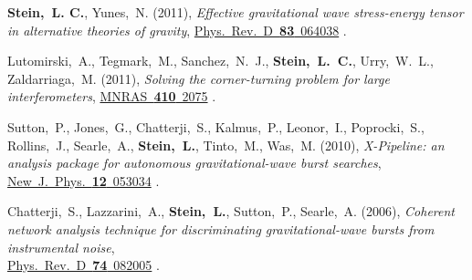 \begin{etaremune}[start=\value{pubCounter}]
\item
  {\bf Stein,~L. C.}, Yunes,~N.
  (2011),
  {\it Effective gravitational wave stress-energy tensor in
    alternative theories of gravity},
  \href{http://dx.doi.org/10.1103/PhysRevD.83.064038}{Phys.~Rev.~D~{\bf 83}~064038}
  .
\item
  Lutomirski,~A., Tegmark,~M., Sanchez,~N.~J., {\bf
    Stein,~L.~C.}, Urry,~W.~L., Zaldarriaga,~M.
  (2011),
  {\it Solving the corner-turning problem for large interferometers},
  \href{http://dx.doi.org/10.1111/j.1365-2966.2010.17587.x}{MNRAS~{\bf 410}~2075}
  .
\item
  Sutton,~P., Jones,~G., Chatterji,~S., Kalmus,~P., Leonor,~I.,
  Poprocki,~S., Rollins,~J., Searle,~A., {\bf Stein,~L.}, Tinto,~M.,
  Was,~M.
  (2010),
  {\it X-Pipeline: an analysis package for autonomous
    gravitational-wave burst searches},
  \href{http://dx.doi.org/10.1088/1367-2630/12/5/053034}{New~J.~Phys.~{\bf 12}~053034}
  .
\item
  Chatterji,~S., Lazzarini,~A., {\bf Stein,~L.}, Sutton,~P.,
  Searle,~A.
  (2006),
  {\it Coherent network analysis technique for
    discriminating gravitational-wave bursts from instrumental noise},\\
  \href{http://dx.doi.org/10.1103/PhysRevD.74.082005}{Phys.~Rev.~D~{\bf 74}~082005}
  .
  \setcounter{pubCounter}{\value{enumi}}
\end{etaremune}

